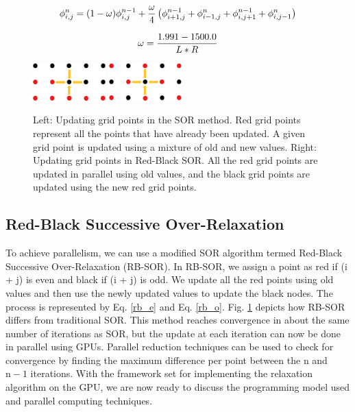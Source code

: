 \begin{equation}{\label{sor_eq}}
 \phi_{i,j}^{n} = (1-\omega)\phi^{n-1}_{i,j} + \frac{\omega}{4} \left(\phi^{n-1}_{i+1,j} + \phi^n_{i-1,j} + \phi^{n-1}_{i,j+1} + \phi^n_{i,j-1} \right)
\end{equation}

\begin{equation}{\label{omg}}
\omega = \frac{1.991 - 1500.0}{L*R}
\end{equation}

\begin{figure}
\centering
\includegraphics[width=0.25\textwidth]{ch4/figs/SOR.png}
\hspace{1 cm}
 \includegraphics[width=0.25\textwidth]{ch4/figs/RB-SOR.png}
\caption{\label{fig: sor_methods} Left: Updating grid points in the SOR method. Red grid points represent all the points that have already been updated. A given grid point is updated using a mixture of old and new values. Right: Updating grid points in Red-Black SOR. All the red grid points are updated in parallel using old values, and the black grid points are updated using the new red grid points.}
\end{figure}



\subsection{Red-Black Successive Over-Relaxation}
To achieve parallelism, we can use a modified SOR algorithm termed Red-Black Successive Over-Relaxation (RB-SOR)\cite{RB_SOR_paper}. In RB-SOR, we assign a point as red if (i + j) is even and black if (i + j) is odd. We update all the red points using old values and then use the newly updated values to update the black nodes. The process is represented by Eq. \ref{rb_e} and Eq. \ref{rb_o}. Fig. \ref{fig: sor_methods} depicts how RB-SOR differs from traditional SOR. This method reaches convergence in about the same number of iterations as SOR, but the update at each iteration can now be done in parallel using GPUs. Parallel reduction techniques can be used to check for convergence by finding the maximum difference per point between the $\text{n}$ and $\text{n}-1$ iterations. With the framework set for implementing the relaxation algorithm on the GPU, we are now ready to discuss the programming model used and parallel computing techniques.


